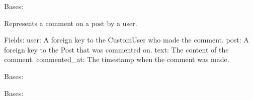 \documentclass[letterpaper,10pt,english]{sphinxmanual}
\begin{document}
\begin{fulllineitems}
\label{\detokenize{modules/models:interactions.models.Comment}}
\pysigstartsignatures
{}
\pysigstopsignatures
\sphinxAtStartPar
Bases: 

\sphinxAtStartPar
Represents a comment on a post by a user.

\sphinxAtStartPar
Fields:
\sphinxhyphen{} user: A foreign key to the CustomUser who made the comment.
\sphinxhyphen{} post: A foreign key to the Post that was commented on.
\sphinxhyphen{} text: The content of the comment.
\sphinxhyphen{} commented\_at: The timestamp when the comment was made.

\begin{fulllineitems}
\label{\detokenize{modules/models:interactions.models.Comment.DoesNotExist}}
\pysigstartsignatures
{}
\pysigstopsignatures
\sphinxAtStartPar
Bases: 

\end{fulllineitems}


\begin{fulllineitems}
\label{\detokenize{modules/models:interactions.models.Comment.MultipleObjectsReturned}}
\pysigstartsignatures
{}
\pysigstopsignatures
\sphinxAtStartPar
Bases: 

\end{fulllineitems}


\end{fulllineitems}

\end{document}
